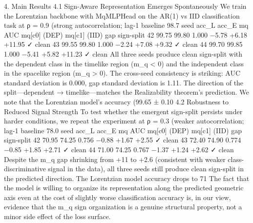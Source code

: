 4. Main Results
4.1 Sign-Aware Representation Emerges Spontaneously
We train the Lorentzian backbone with MqMLPHead on the AR(1) vs IID classification task at ρ = 0.9 (strong autocorrelation; lag-1 baseline 98.7%
seed
acc_L
acc_E
mq AUC
mq[c0] (DEP)
mq[c1] (IID)
gap
sign-split
42
99.75%
99.80%
1.000
−5.78
+6.18
+11.95
✓ clean
43
99.55%
99.80%
1.000
−2.24
+7.08
+9.32
✓ clean
44
99.70%
99.85%
1.000
−5.41
+5.82
+11.23
✓ clean
All three seeds produce clean sign-split with the dependent class in the timelike region (m_q < 0) and the independent class in the spacelike region (m_q > 0). The cross-seed consistency is striking: AUC standard deviation is 0.000, gap standard deviation is 1.11. The direction of the split—dependent → timelike—matches the Realizability theorem's prediction.
We note that the Lorentzian model's accuracy (99.65 ± 0.10%
4.2 Robustness to Reduced Signal Strength
To test whether the emergent sign-split persists under harder conditions, we repeat the experiment at ρ = 0.3 (weaker autocorrelation; lag-1 baseline 78.0%
seed
acc_L
acc_E
mq AUC
mq[c0] (DEP)
mq[c1] (IID)
gap
sign-split
42
70.95%
74.25%
0.756
−0.88
+1.67
+2.55
✓ clean
43
72.40%
74.90%
0.774
−0.85
+1.85
+2.71
✓ clean
44
71.00%
74.25%
0.767
−1.37
+1.24
+2.62
✓ clean
Despite the m_q gap shrinking from +11 to +2.6 (consistent with weaker class-discriminative signal in the data), all three seeds still produce clean sign-split in the predicted direction. The Lorentzian model accuracy drops to 71%
The fact that the model is willing to organize its representation along the predicted geometric axis even at the cost of slightly worse classification accuracy is, in our view, evidence that the m_q sign organization is a genuine structural property, not a minor side effect of the loss surface.

